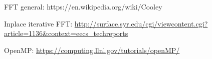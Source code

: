 FFT general:
https://en.wikipedia.org/wiki/Cooley%

Inplace iterative FFT:
\url{http://surface.syr.edu/cgi/viewcontent.cgi?article=1136&context=eecs_techreports}

OpenMP: 
\url{https://computing.llnl.gov/tutorials/openMP/}